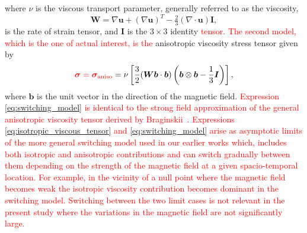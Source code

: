 \documentclass[12pt]{article}
\newcommand{\rs}[2]{\textcolor{red}{#2}}
\newcommand{\ten}[1]{{\bm #1}}
\renewcommand{\vec}[1]{{\bm #1}}
\begin{document}
where $\nu$ is the viscous transport parameter, generally referred to as the viscosity,
\begin{equation}
  \label{eq:rate_of_strain}
  \ten{W} = \nabla\vec{u} + (\nabla\vec{u})^T - \tfrac{2}{3}(\nabla \cdot \vec{u})\ten{I},
\end{equation}
is the rate of strain tensor, and $\ten{I}$ is the  $3\times 3$
identity \rs{}{tensor. The second model, which is the one of actual interest, is the} anisotropic viscosity stress
tensor given by
\begin{equation}
  \label{eq:switching_model}
\rs{}{\ten{\sigma} = \ten{\sigma}_\text{aniso}} = \nu \left[\frac{3}{2}(\ten{W}\vec{b}\cdot\vec{b}) \left( \vec{b} \otimes \vec{b} - \frac{1}{3}\ten{I} \right)\right],
\end{equation}
where $\vec{b}$ is the unit vector in the direction of the magnetic
field.
\rs{}{
Expression \eqref{eq:switching_model} is identical to the strong field approximation of the
general anisotropic viscosity tensor derived by Braginskii~\cite{braginskiiTransportProcessesPlasma1965}.
Expressions \eqref{eq:isotropic_viscous_tensor} and \eqref{eq:switching_model} arise as asymptotic limits of the
more general switching model used in our earlier works 
\cite{mactaggartBraginskiiMagnetohydrodynamicsArbitrary2017,quinnEffectAnisotropicViscosity2020a,Quinn2021}
which, includes both isotropic and anisotropic contributions and can
switch gradually between them depending on the strength of the
magnetic field at a given spacio-temporal location. For example, in
the vicinity of a null point where the magnetic field becomes weak the
isotropic viscosity contribution becomes dominant in the switching
model. Switching between the two limit cases is not relevant in the
present study where the variations in the magnetic field are not
significantly large.}
\end{document}
